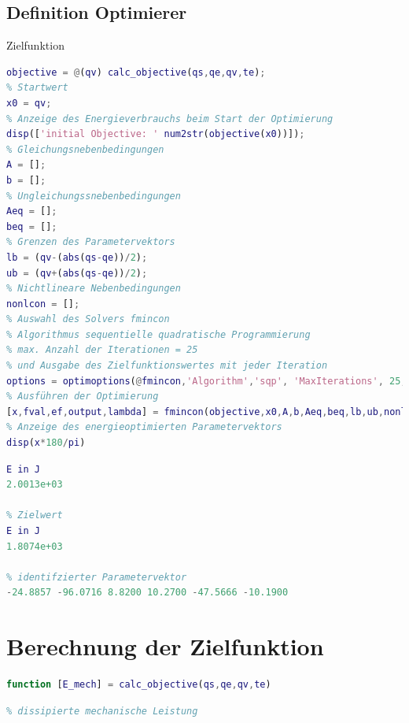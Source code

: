 \subsection{Definition Optimierer}
%
\begin{par}
	Zielfunktion
\end{par} \vspace{1em}
\begin{lstlisting}[language=Matlab, numbers=none]
objective = @(qv) calc_objective(qs,qe,qv,te);
% Startwert
x0 = qv;
% Anzeige des Energieverbrauchs beim Start der Optimierung
disp(['initial Objective: ' num2str(objective(x0))]);
% Gleichungsnebenbedingungen
A = [];
b = [];
% Ungleichungssnebenbedingungen
Aeq = [];
beq = [];
% Grenzen des Parametervektors
lb = (qv-(abs(qs-qe))/2);
ub = (qv+(abs(qs-qe))/2);
% Nichtlineare Nebenbedingungen
nonlcon = [];
% Auswahl des Solvers fmincon
% Algorithmus sequentielle quadratische Programmierung
% max. Anzahl der Iterationen = 25
% und Ausgabe des Zielfunktionswertes mit jeder Iteration
options = optimoptions(@fmincon,'Algorithm','sqp', 'MaxIterations', 25,'PlotFcn',@optimplotfval);
% Ausführen der Optimierung
[x,fval,ef,output,lambda] = fmincon(objective,x0,A,b,Aeq,beq,lb,ub,nonlcon,options);
% Anzeige des energieoptimierten Parametervektors
disp(x*180/pi)
\end{lstlisting}
\color{lightgray} \begin{lstlisting}[language=Matlab, numbers=none]
% Startwert
E in J
2.0013e+03

% Zielwert
E in J
1.8074e+03

% identifzierter Parametervektor
-24.8857 -96.0716 8.8200 10.2700 -47.5666 -10.1900
\end{lstlisting} \color{black}
%
%
%
\setcounter{section}{6}
\section{Berechnung der Zielfunktion}
%
\label{add:zielfunktion}
\begin{lstlisting}[language=Matlab, numbers=none]
function [E_mech] = calc_objective(qs,qe,qv,te)
\end{lstlisting}
\begin{lstlisting}[language=Matlab, numbers=none]
% Berechung der Zielfunktion (Energieverbrauch) über die nicht
% dissipierte mechanische Leistung
\end{lstlisting}
%
